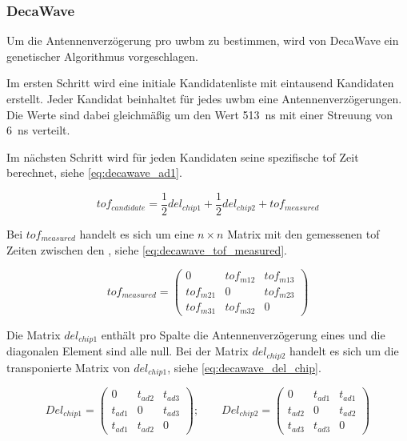 %
%
%
\subsubsection{DecaWave}

Um die Antennenverzögerung pro \Gls{uwbm} zu bestimmen, wird von DecaWave ein genetischer Algorithmus vorgeschlagen. \cite{decawave2014calibration}

Im ersten Schritt wird eine initiale Kandidatenliste mit eintausend Kandidaten erstellt. Jeder Kandidat beinhaltet für jedes \Gls{uwbm} eine Antennenverzögerungen. Die Werte sind dabei gleichmäßig um den Wert \SI{513}{\ns} mit einer Streuung von \SI{6}{\ns} verteilt.

Im nächsten Schritt wird für jeden Kandidaten seine spezifische \Gls{tof} Zeit berechnet, siehe \autoref{eq:decawave_ad1}.

\begin{equation}
tof_{candidate}=\frac12 del_{chip1} + \frac12 del_{chip2} + tof_{measured}\label{eq:decawave_ad1}
\end{equation}

Bei $tof_{measured}$ handelt es sich um eine $n \times n$ Matrix mit den gemessenen \Gls{tof} Zeiten zwischen den , siehe \autoref{eq:decawave_tof_measured}.

\begin{equation}
tof_{measured} = \begin{pmatrix}0 & tof_{m12} & tof_{m13} \\ tof_{m21} & 0 & tof_{m23} \\ tof_{m31} & tof_{m32} & 0 \end{pmatrix} \label{eq:decawave_tof_measured}
\end{equation}

Die Matrix $del_{chip1}$ enthält pro Spalte die Antennenverzögerung eines  und die diagonalen Element sind alle null. Bei der Matrix $del_{chip2}$ handelt es sich um die transponierte Matrix von $del_{chip1}$, siehe \autoref{eq:decawave_del_chip}.

\begin{equation}
Del_{chip1} = \begin{pmatrix}0 & t_{ad2} & t_{ad3} \\ t_{ad1} & 0 & t_{ad3} \\ t_{ad1} & t_{ad2} & 0 \end{pmatrix}; \qquad Del_{chip2} = \begin{pmatrix}0 & t_{ad1} & t_{ad1} \\ t_{ad2} & 0 & t_{ad2} \\ t_{ad3} & t_{ad3} & 0 \end{pmatrix} \label{eq:decawave_del_chip}
\end{equation}

